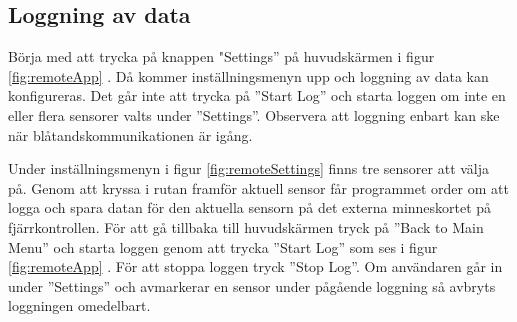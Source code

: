 \subsection{Loggning av data}
Börja med att trycka på knappen "Settings” på huvudskärmen i figur
\ref{fig:remoteApp} . Då kommer inställningsmenyn upp och loggning av data kan
konfigureras. Det går inte att trycka på ”Start Log”  och starta loggen om inte
en eller flera sensorer valts under ”Settings”.
Observera att loggning enbart kan ske när blåtandskommunikationen är igång.

Under inställningsmenyn i figur \ref{fig:remoteSettings} finns tre sensorer att
välja på. Genom att kryssa i rutan framför aktuell sensor får programmet order
om att logga och spara datan för den aktuella sensorn på det externa
minneskortet på fjärrkontrollen. För att gå tillbaka till huvudskärmen tryck på
”Back to Main Menu” och starta loggen genom att trycka ”Start Log” som ses i
figur \ref{fig:remoteApp} . För att stoppa loggen tryck ”Stop Log”. Om användaren
går in under ”Settings” och avmarkerar en sensor under pågående loggning så
avbryts loggningen omedelbart.